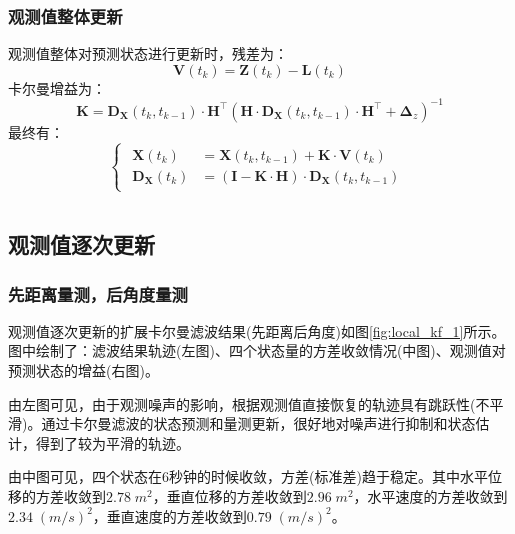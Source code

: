 \documentclass[12pt, onecolumn]{article}
\newcommand\normf{\fangsong}
\begin{document}
	\subsubsection{\normf 观测值整体更新}
	观测值整体对预测状态进行更新时，残差为：
	\begin{equation}
	\boldsymbol{V}(t_k)=\boldsymbol{Z}(t_k)-\boldsymbol{L}(t_k)
	\end{equation}
	卡尔曼增益为：
	\begin{equation}
	\boldsymbol{K}=\boldsymbol{D}_{\boldsymbol{X}}(t_{k},t_{k-1})\cdot\boldsymbol{H}^\top\left( \boldsymbol{H}\cdot\boldsymbol{D}_{\boldsymbol{X}}(t_k,t_{k-1})\cdot\boldsymbol{H}^\top+\boldsymbol{\Delta}_z\right) ^{-1}
	\end{equation}
	最终有：
	\begin{equation}
	\begin{cases}
	\begin{aligned}
	\boldsymbol{X}(t_k)&=\boldsymbol{X}(t_k,t_{k-1})+\boldsymbol{K}\cdot
		\boldsymbol{V}(t_k)
		\\
	\boldsymbol{D}_{\boldsymbol{X}}(t_k)&=\left( \boldsymbol{I}-\boldsymbol{K}\cdot\boldsymbol{H}\right)\cdot\boldsymbol{D}_{\boldsymbol{X}}(t_k,t_{k-1}) 
	\end{aligned}
	\end{cases}
	\end{equation}
	
	\newpage
	\section{\normf{实验结果}}
	\subsection{\normf 观测值逐次更新}
	\subsubsection{\normf 先距离量测，后角度量测}

	观测值逐次更新的扩展卡尔曼滤波结果(先距离后角度)如图\ref{fig:local_kf_1}所示。图中绘制了：滤波结果轨迹(左图)、四个状态量的方差收敛情况(中图)、观测值对预测状态的增益(右图)。
	
	由左图可见，由于观测噪声的影响，根据观测值直接恢复的轨迹具有跳跃性(不平滑)。通过卡尔曼滤波的状态预测和量测更新，很好地对噪声进行抑制和状态估计，得到了较为平滑的轨迹。
	
	由中图可见，四个状态在6秒钟的时候收敛，方差(标准差)趋于稳定。其中水平位移的方差收敛到$2.78\;m^2$，垂直位移的方差收敛到$2.96\;m^2$，水平速度的方差收敛到$2.34\;(m/s)^2$，垂直速度的方差收敛到$0.79\;(m/s)^2$。
	
\end{document}
